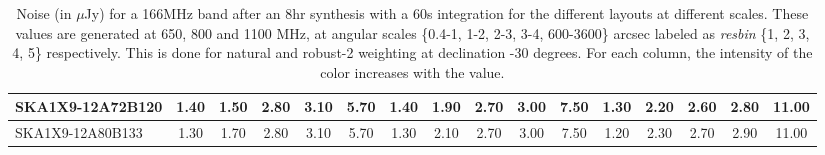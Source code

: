 \begin{table}[htp]
{{\begin{tabular}{|lccccc||ccccc||ccccc|}
SKA1X9-12A72B120 & 1.40 \cellcolor{blue!28.50} & 1.50 \cellcolor{red!30.00} & 2.80 \cellcolor{green!60.00} & 3.10 \cellcolor{orange!60.00} & 5.70 \cellcolor{purple!49.50} & 1.40 \cellcolor{blue!32.00} & 1.90 \cellcolor{red!49.50} & 2.70 \cellcolor{green!60.00} & 3.00 \cellcolor{orange!60.00} & 7.50 \cellcolor{purple!60.00} & 1.30 \cellcolor{blue!26.40} & 2.20 \cellcolor{red!49.50} & 2.60 \cellcolor{green!49.50} & 2.80 \cellcolor{orange!49.50} & 11.00 \cellcolor{purple!60.00}\\ \hline 
SKA1X9-12A80B133 & 1.30 \cellcolor{blue!18.00} & 1.70 \cellcolor{red!42.00} & 2.80 \cellcolor{green!60.00} & 3.10 \cellcolor{orange!60.00} & 5.70 \cellcolor{purple!49.50} & 1.30 \cellcolor{blue!18.00} & 2.10 \cellcolor{red!60.00} & 2.70 \cellcolor{green!60.00} & 3.00 \cellcolor{orange!60.00} & 7.50 \cellcolor{purple!60.00} & 1.20 \cellcolor{blue!18.00} & 2.30 \cellcolor{red!60.00} & 2.70 \cellcolor{green!60.00} & 2.90 \cellcolor{orange!60.00} & 11.00 \cellcolor{purple!60.00}\\ \hline 
\end{tabular}}
\vspace{-0.300000cm}
\hspace{1cm} 

\vspace{.25cm}
\caption{Noise (in $\mu$Jy) for a 166MHz band after an 8hr synthesis with a 60s integration for the different layouts at different scales. These values are generated at 650, 800 and 1100 MHz, at angular scales \{0.4-1, 1-2, 2-3, 3-4, 600-3600\} arcsec labeled as {\it resbin} \{1, 2, 3, 4, 5\} respectively. This is done for natural and robust-2 weighting at declination -30 degrees. For each column, the intensity of the color increases with the value.}\label{tab:noise166}}
 \end{table}
